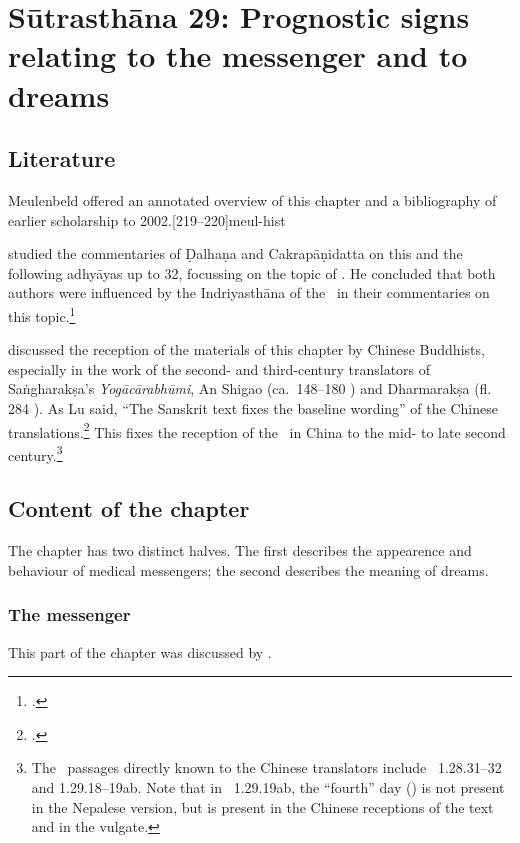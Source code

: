 \chapter{Sūtrasthāna 29: Prognostic signs relating to the messenger 
and to dreams}

\section{Literature}

Meulenbeld offered an annotated overview of this chapter and a bibliography
of earlier scholarship to 2002.[219--220]{meul-hist} 

\citeauthor{gosw-2011} studied the commentaries of Ḍalhaṇa and 
Cakrapāṇidatta on this and the following adhyāyas up to 32, focussing on the 
topic of .  He concluded that both 
authors were influenced by the Indriyasthāna of the \CS\ in their commentaries 
on this topic.\footcite{gosw-2011}

\citet{lu-2025} discussed the reception of the materials of this
chapter by Chinese Buddhists, especially in the work of the second-
and third-century translators of Saṅgharakṣa's \emph{Yogācārabhūmi},
An Shigao (ca.\ 148--180 \CE) and Dharmarakṣa (fl.\,284 \CE).  As Lu
said, “The Sanskrit text fixes the baseline wording” of the Chinese
translations.\footcite[2]{lu-2025}  This fixes the reception of the
\SS\ in China to the mid- to late second century.\footnote{The \SS\ passages
    directly known to the Chinese translators include \SS\ 1.28.31--32 and 
    1.29.18--19ab.  Note that in \SS\ 1.29.19ab, the “fourth” day ()
    is not present in the Nepalese version, but is present in the Chinese 
    receptions of the text and in the vulgate.}
    
\section{Content of the chapter}

The chapter has two distinct halves.  The first describes the 
appearence and behaviour of medical messengers; the second 
describes the meaning of dreams.

\subsection{The messenger}

This part of the chapter was 
discussed by \citet[111--112]{wujad-2012}.

